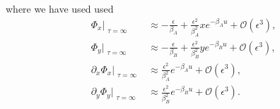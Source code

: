 \documentclass[11pt]{article}
\begin{document}
where we have used used
\begin{subequations}\begin{align}
    \Phi_x \Big\vert_{\substack{\tau=\infty}} &\approx - \frac{\epsilon}{\beta_A} + \frac{\epsilon^2}{\beta_A^2}xe^{-\beta_Au} +\mathcal{O}(\epsilon^3), \\
    \Phi_y \Big\vert_{\substack{\tau=\infty}} &\approx - \frac{\epsilon}{\beta_B} + \frac{\epsilon^2}{\beta_B^2}ye^{-\beta_Bu} +\mathcal{O}(\epsilon^3), \\
    \partial_x \Phi_x \Big\vert_{\substack{\tau=\infty}} &\approx \frac{\epsilon^2}{\beta_A^2}e^{-\beta_Au} +\mathcal{O}(\epsilon^3), \\
    \partial_y \Phi_y \Big\vert_{\substack{\tau=\infty}} &\approx \frac{\epsilon^2}{\beta_B^2}e^{-\beta_Bu} +\mathcal{O}(\epsilon^3).
\end{align}\end{subequations}
\end{document}
